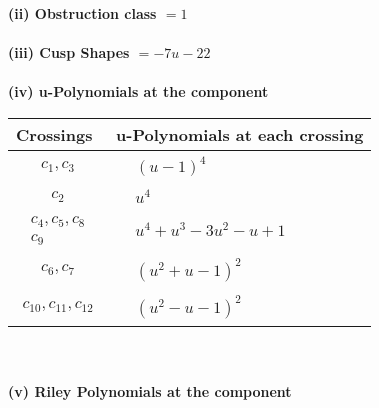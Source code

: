 \documentclass[1p]{elsarticle_modified}
\theoremstyle{definition}
\begin{document}
\flushleft \textbf{(ii) Obstruction class $= 1$}\\~\\
\flushleft \textbf{(iii) Cusp Shapes $= -7 u-22$}\\~\\
\newpage\renewcommand{\arraystretch}{1}
\flushleft \textbf{(iv) u-Polynomials at the component}\newline \\
\begin{tabular}{m{50pt}|m{274pt}}
Crossings & \hspace{64pt}u-Polynomials at each crossing \\
\hline $$\begin{aligned}c_{1},c_{3}\end{aligned}$$&$\begin{aligned}
&(u-1)^4
\end{aligned}$\\
\hline $$\begin{aligned}c_{2}\end{aligned}$$&$\begin{aligned}
&u^4
\end{aligned}$\\
\hline $$\begin{aligned}c_{4},c_{5},c_{8}\\c_{9}\end{aligned}$$&$\begin{aligned}
&u^4+u^3-3 u^2- u+1
\end{aligned}$\\
\hline $$\begin{aligned}c_{6},c_{7}\end{aligned}$$&$\begin{aligned}
&(u^2+u-1)^2
\end{aligned}$\\
\hline $$\begin{aligned}c_{10},c_{11},c_{12}\end{aligned}$$&$\begin{aligned}
&(u^2- u-1)^2
\end{aligned}$\\
\hline
\end{tabular}\\~\\
\newpage\renewcommand{\arraystretch}{1}
\flushleft \textbf{(v) Riley Polynomials at the component}\newline \\
\end{document}
